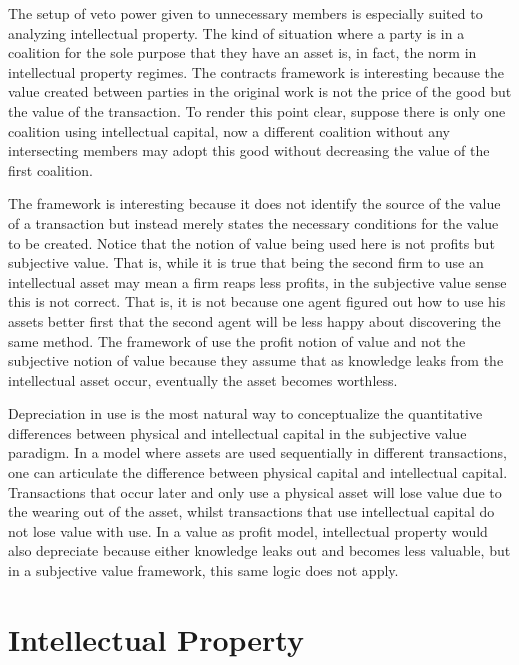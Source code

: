 \documentclass[12pt]{article}
\numberwithin{equation}{section}
\begin{document}

The setup of veto power given to unnecessary members is especially suited to analyzing intellectual property. The kind of situation where a party is in a coalition for the sole purpose that they have an asset is, in fact, the norm in intellectual property regimes. The contracts framework is interesting because the value created between parties in the original work is not the price of the good but the value of the transaction. To render this point clear, suppose there is only one coalition using intellectual capital, now a different coalition without any intersecting members may adopt this good without decreasing the value of the first coalition.


The framework is interesting because it does not identify the source of the value of a transaction but instead merely states the necessary conditions for the value to be created. Notice that the notion of value being used here is not profits but subjective value. That is, while it is true that being the second firm to use an intellectual asset may mean a firm reaps less profits, in the subjective value sense this is not correct. That is, it is not because one agent figured out how to use his assets better first that the second agent will be less happy about discovering the same method. The framework of \cite{anton1994expropriation} use the profit notion of value and not the subjective notion of value because they assume that as knowledge leaks from the intellectual asset occur, eventually the asset becomes worthless.

Depreciation in use is the most natural way to conceptualize the quantitative differences between physical and intellectual capital in the subjective value paradigm. In a model where assets are used sequentially in different transactions, one can articulate the difference between physical capital and intellectual capital. Transactions that occur later and only use a physical asset will lose value due to the wearing out of the asset, whilst transactions that use intellectual capital do not lose value with use. In a value as profit model, intellectual property would also depreciate because either knowledge leaks out and becomes less valuable, but in a subjective value framework, this same logic does not apply.

\section{Intellectual Property}
\end{document}
